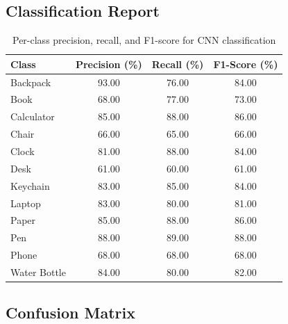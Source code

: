 \documentclass[10pt]{article}
\begin{document}
\subsection{Classification Report}
\begin{table}[h!]
\centering
\caption{Per-class precision, recall, and F1-score for CNN classification}
\label{tab:classification_report}
\begin{tabular}{|l|c|c|c|}
\hline
        \textbf{Class}       & \textbf{Precision (\%)} & \textbf{Recall (\%)} & \textbf{F1-Score (\%)} \\ \hline
        Backpack             & 93.00                    & 76.00                 & 84.00                  \\
        Book                 & 68.00                    & 77.00                 & 73.00                  \\
        Calculator           & 85.00                    & 88.00                 & 86.00                  \\
        Chair                & 66.00                    & 65.00                 & 66.00                  \\
        Clock                & 81.00                    & 88.00                 & 84.00                  \\
        Desk                 & 61.00                    & 60.00                 & 61.00                  \\
        Keychain             & 83.00                    & 85.00                 & 84.00                  \\
        Laptop               & 83.00                    & 80.00                 & 81.00                  \\
        Paper                & 85.00                    & 88.00                 & 86.00                  \\
        Pen                  & 88.00                    & 89.00                 & 88.00                  \\
        Phone                & 68.00                    & 68.00                 & 68.00                  \\
        Water Bottle         & 84.00                    & 80.00                 & 82.00                  \\ \hline
\end{tabular}
\end{table}

\subsection{Confusion Matrix}
\end{document}
